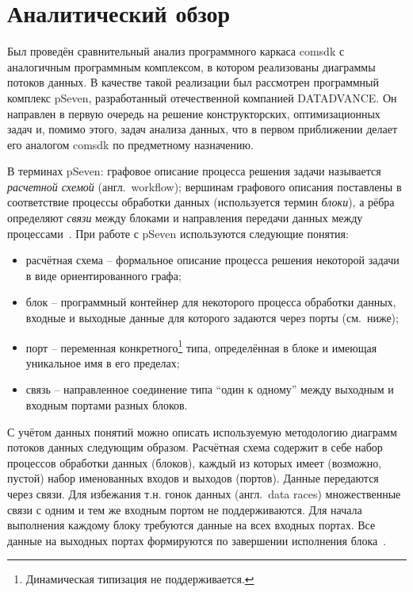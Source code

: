 \chapter{Аналитический обзор}\label{chap2_comp_method}
Был проведён сравнительный анализ программного каркаса comsdk с аналогичным программным комплексом, в котором реализованы диаграммы потоков данных. В качестве такой реализации был рассмотрен программный комплекс pSeven, разработанный отечественной компанией DATADVANCE. Он направлен в первую очередь на решение конструкторских, оптимизационных задач и, помимо этого, задач анализа данных, что в первом приближении делает его аналогом comsdk по предметному назначению.

В терминах \textsf{pSeven}: графовое описание процесса решения задачи называется \textit{расчетной схемой} (англ.~workflow); вершинам графового описания поставлены в соответствие процессы обработки данных (используется термин \textit{блоки}), а рёбра определяют \textit{связи} между блоками и направления передачи данных между процессами~\cite{NazarenkoDFM2015}. При работе с pSeven используются следующие понятия:
\begin{itemize}
    \item \textsf{расчётная схема} -- формальное описание процесса решения некоторой задачи в виде ориентированного графа;
    \item \textsf{блок} -- программный контейнер для некоторого процесса обработки данных, входные и выходные данные для которого задаются через порты (см.~ниже);
    \item \textsf{порт} -- переменная конкретного\footnote{Динамическая типизация не поддерживается.} типа, определённая в блоке и имеющая уникальное имя в его пределах;
    \item \textsf{связь} -- направленное соединение типа ``один к одному'' между выходным и входным портами разных блоков.
\end{itemize}

С учётом данных понятий можно описать используемую методологию диаграмм потоков данных следующим образом. Расчётная схема содержит в себе набор процессов обработки данных (блоков), каждый из которых имеет (возможно, пустой) набор именованных входов и выходов (портов). Данные передаются через связи. Для избежания т.н. гонок данных (англ.~data races) множественные связи с одним и тем же входным портом не поддерживаются. Для начала выполнения каждому блоку требуются данные на всех входных портах. Все данные на выходных портах формируются по завершении исполнения блока~\cite{NazarenkoDFM2015}.

